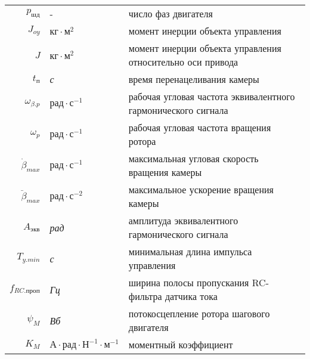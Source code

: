 \begin{table}[ht!]
\begin{tabular}{rll}
    $p_\textit{шд}$                 & -             & число фаз двигателя \\

    $J_{oy}$                        & $\textit{кг} \cdot \textit{м}^{2}$        & момент инерции объекта управления \\

    $J$                             & $\textit{кг} \cdot \textit{м}^{2}$        & момент инерции объекта управления относительно оси привода \\

    $t_\textit{п}$                  & \textit{с}                                & время перенацеливания камеры \\

    $\omega_{\beta.p}$              & $\textit{рад} \cdot \textit{с}^{-1}$      & рабочая угловая частота эквивалентного гармонического сигнала \\

    $\omega_{p}$                    & $\textit{рад} \cdot \textit{с}^{-1}$      & рабочая угловая частота вращения ротора \\

    $\dot{\beta}_{max}$             & $\textit{рад} \cdot \textit{с}^{-1}$      & максимальная угловая скорость вращения камеры \\

    $\ddot{\beta}_{max}$            & $\textit{рад} \cdot \textit{с}^{-2}$      & максимальное ускорение вращения камеры \\

    $A_{\textit{экв}}$              & \textit{рад}                              & амплитуда эквивалентного гармонического сигнала \\

    $T_{y.min}$                     & \textit{с}                                & минимальная длина импульса управления \\

    $f_{RC.\textit{проп}}$          & \textit{Гц}                               & ширина полосы пропускания RC-фильтра датчика тока \\

    $\psi_{M}$                      & \textit{Вб}                               & потокосцепление ротора шагового двигателя \\

    $K_{M}$                         & $\textit{А} \cdot \textit{рад} \cdot \textit{Н}^{-1} \cdot \textit{м}^{-1}$ & моментный коэффициент \\


\end{tabular}
\end{table}
